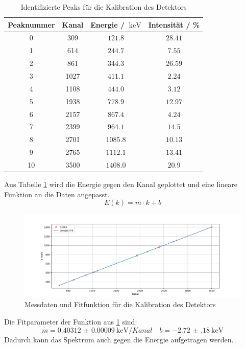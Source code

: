 \begin{table}
  \centering
  \caption{Identifizierte Peaks für die Kalibration des Detektors}
  \label{tab:peaks_01}
  \begin{tabular}{c c c c}
    \toprule
    Peaknummer&Kanal&Energie / $\SI{}{\kilo\eV}$&Intensität / \%\\
    \midrule
    0  &309   &$\num{121.8}$&$\num{28.41}$\\
    1   &614   &$\num{244.7}$&$\num{7.55}$\\
    2   &861   &$\num{344.3}$&$\num{26.59}$\\
    3   &1027  &$\num{411.1}$&$\num{2.24}$\\
    4   &1108  &$\num{444.0}$&$\num{3.12}$\\
    5   &1938  &$\num{778.9}$&$\num{12.97}$\\
    6   &2157  &$\num{867.4}$&$\num{4.24}$\\
    7   &2399  &$\num{964.1}$&$\num{14.5}$\\
    8   &2701  &$\num{1085.8}$&$\num{10.13}$\\
    9  &2765  &$\num{1112.1}$&$\num{13.41}$\\
    10  &3500  &$\num{1408.0}$&$\num{20.9}$\\
    \bottomrule
  \end{tabular}
\end{table}
Aus Tabelle \ref{tab:peaks_01} wird die Energie gegen den Kanal geplottet und eine lineare Funktion an die Daten 
angepasst.
\begin{equation*}
  \label{eq:linear}
  E(k) = m\cdot k + b
\end{equation*}
\FloatBarrier
\begin{figure}
  \centering
  \includegraphics[width=\textwidth,keepaspectratio]{figure/Lin_Fit_01.pdf}
  \caption{Messdaten und Fitfunktion für die Kalibration des Detektors}
  \label{fig:Lin_Fit:01}
\end{figure}
\FloatBarrier
Die Fitparameter der Funktion aus \ref{fig:Lin_Fit:01} sind:
\begin{equation*}
  m = \SI{0.40312(9)}{\kilo\eV\per Kanal} \quad b = \SI{-2.72(18)}{\kilo\eV}
\end{equation*}
Dadurch kann das Spektrum auch gegen die Energie aufgetragen werden.

